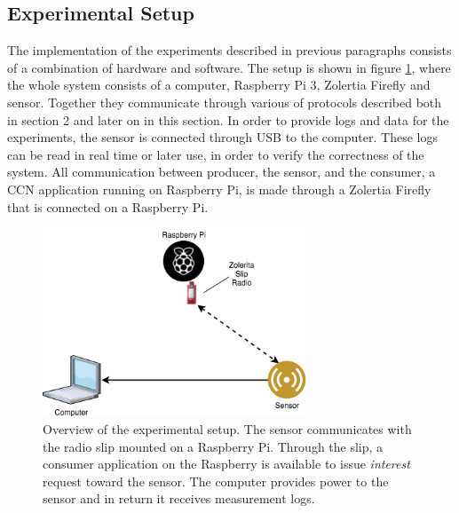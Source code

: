 \subsection{Experimental Setup}
The implementation of the experiments described in previous paragraphs consists of a combination of hardware and software. The setup is shown in figure \ref{fig:experiment_setup}, where the whole system consists of a computer, Raspberry Pi 3, Zolertia Firefly and sensor. Together they communicate through various of protocols described both in section 2 and later on in this section. 
In order to provide logs and data for the experiments, the sensor is connected through USB to the computer. These logs can be read in real time or later use, in order to verify the correctness of the system. All communication between producer, the sensor, and the consumer, a CCN application running on Raspberry Pi, is made through a Zolertia Firefly that is connected on a Raspberry Pi.

\begin{figure}\centering
	\includegraphics[width=0.7\textwidth]{figures/experiment_setup.png}
	\caption{Overview of the experimental setup. The sensor communicates with the radio slip mounted on a Raspberry Pi. Through the slip, a consumer application on the Raspberry is available to issue \textit{interest} request toward the sensor. The computer provides power to the sensor and in return it receives measurement logs.}
	\label{fig:experiment_setup}
\end{figure}






